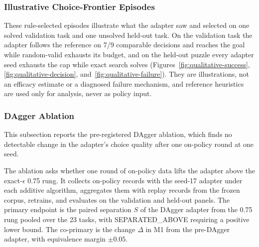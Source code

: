 \subsubsection{Illustrative Choice-Frontier Episodes}
\label{app:cf-qualitative}

These rule-selected episodes illustrate what the adapter saw and selected on one solved validation task and one unsolved held-out task. On the validation task the adapter follows the reference on 7/9 comparable decisions and reaches the goal while random-valid exhausts its budget, and on the held-out puzzle every adapter seed exhausts the cap while exact search solves (Figures~\ref{fig:qualitative-success}, \ref{fig:qualitative-decision}, and~\ref{fig:qualitative-failure}). They are illustrations, not an efficacy estimate or a diagnosed failure mechanism, and reference heuristics are used only for analysis, never as policy input.

\clearpage

\subsubsection{DAgger Ablation}
\label{app:results-cf-dagger}

This subsection reports the pre-registered DAgger ablation, which finds no detectable change in the adapter's choice quality after one on-policy round at one seed.

The ablation asks whether one round of on-policy data lifts the adapter above the exact-$\epsilon$ 0.75 rung. It collects on-policy records with the seed-17 adapter under each additive algorithm, aggregates them with replay records from the frozen corpus, retrains, and evaluates on the validation and held-out panels. The primary endpoint is the paired separation $S$ of the DAgger adapter from the 0.75 rung pooled over the 23 tasks, with SEPARATED\_ABOVE requiring a positive lower bound. The co-primary is the change $\Delta$ in M1 from the pre-DAgger adapter, with equivalence margin $\pm 0.05$.

